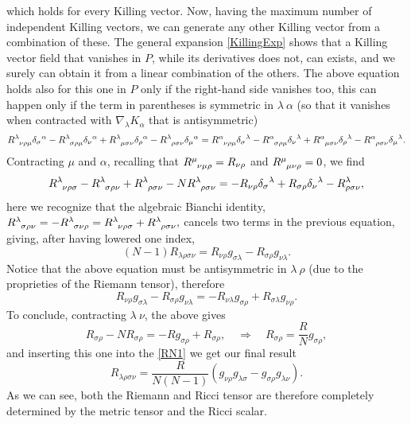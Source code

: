 which holds for every Killing vector. Now, having the maximum number of independent Killing vectors, we can generate any other Killing vector from a combination of these. The general expansion \eqref{KillingExp} shows that a Killing vector field that vanishes in $P$, while its derivatives does not, can exists, and we surely can obtain it from a linear combination of the others. The above equation holds also for this one in $P$ only if the right-hand side vanishes too, this can happen only if the term in parentheses is symmetric in $\lambda\ \alpha$ (so that it vanishes when contracted with $\nabla_\lambda K_\alpha$ that is antisymmetric)$$\tensor R{^\lambda_{\nu\rho\mu}}\delta_{\sigma}\phantom{}^\alpha-\tensor R{^\lambda_{\sigma\rho\mu}}\delta_{\nu}\phantom{}^\alpha+\tensor R{^\lambda_{\mu\sigma\nu}}\delta_{\rho}\phantom{}^\alpha-\tensor R{^\lambda_{\rho\sigma\nu}}\delta_{\mu}\phantom{}^\alpha=\tensor R{^\alpha_{\nu\rho\mu}}\delta_{\sigma}\phantom{}^\lambda-\tensor R{^\alpha_{\sigma\rho\mu}}\delta_{\nu}\phantom{}^\lambda+\tensor R{^\alpha_{\mu\sigma\nu}}\delta_{\rho}\phantom{}^\lambda-\tensor R{^\alpha_{\rho\sigma\nu}}\delta_{\mu}\phantom{}^\lambda.$$
Contracting $\mu$ and $\alpha$, recalling that $\tensor R{^\mu_{\nu\mu\rho }}=R_{\nu\rho}$ and $\tensor R{^\mu_{\mu\nu\rho}}=0$, we find
$$\tensor R{^\lambda_{\nu\rho\sigma}}-\tensor R{^\lambda_{\sigma\rho\nu}}+\tensor R{^\lambda_{\rho\sigma\nu}}-N\tensor R{^\lambda_{\rho\sigma\nu}}=-R_{\nu\rho}\delta_\sigma\phantom{}^\lambda+R_{\sigma\rho}\delta_\nu\phantom{}^\lambda-R^\lambda_{\rho\sigma\nu},$$
here we recognize that the algebraic Bianchi identity, $\tensor R{^\lambda_{\sigma\rho\nu}}=-\tensor R{^\lambda_{\sigma\nu\rho}}=\tensor R{^\lambda_{\nu\rho\sigma}}+\tensor R{^\lambda_{\rho\sigma\nu}},$ cancels two terms in the previous equation, giving, after having lowered one index, 
\begin{equation}\label{RN1}
    (N-1)R_{\lambda\rho\sigma\nu}=R_{\nu\rho}g_{\sigma\lambda}-R_{\sigma\rho}g_{\nu\lambda}.
\end{equation}
Notice that the above equation must be antisymmetric in $\lambda\ \rho$ (due to the proprieties of the Riemann tensor), therefore$$
R_{\nu\rho}g_{\sigma\lambda}-R_{\sigma\rho}g_{\nu\lambda}=-R_{\nu\lambda}g_{\sigma\rho}+R_{\sigma\lambda}g_{\nu\rho}.
$$ To conclude, contracting $\lambda\ \nu$, the above gives 
\begin{equation}
    R_{\sigma\rho}-NR_{\sigma\rho}=-Rg_{\sigma\rho}+R_{\sigma\rho},\quad \Rightarrow\quad \boxed{R_{\sigma\rho}=\frac{R}{N}g_{\sigma\rho}},
\end{equation}
and inserting this one into the \eqref{RN1} we get our final result
\begin{equation}
        R_{\lambda\rho\sigma\nu}=\frac{R}{N(N-1)}(g_{\nu\rho}g_{\lambda\sigma}-g_{\sigma\rho}g_{\lambda\nu}).
\end{equation}
As we can see, both the Riemann and Ricci tensor are therefore completely determined by the metric tensor and the Ricci scalar. 